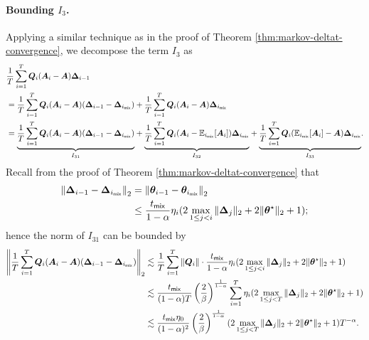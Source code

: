 \paragraph{Bounding $I_3$.} Applying a similar technique as in the proof of Theorem \ref{thm:markov-deltat-convergence}, we decompose the term $I_3$ as
\begin{align}\label{eq:markov-bar-deltat-I3-decompose}
&\frac{1}{T}\sum_{i=1}^T \bm{Q}_i (\bm{A}_i-\bm{A})\bm{\Delta}_{i-1} \nonumber \\ 
&=\frac{1}{T} \sum_{i=1}^T \bm{Q}_i(\bm{A}_i - \bm{A}) (\bm{\Delta}_{i-1} -\bm{\Delta}_{i_{\mathsf{mix}}}) + \frac{1}{T}\sum_{i=1}^T \bm{Q}_i(\bm{A}_i - \bm{A}) \bm{\Delta}_{i_{\mathsf{mix}}} \nonumber \\
&= \underset{I_{31}}{\underbrace{\frac{1}{T} \sum_{i=1}^T \bm{Q}_i(\bm{A}_i - \bm{A}) (\bm{\Delta}_{i-1} -\bm{\Delta}_{i_{\mathsf{mix}}})}} + \underset{I_{32}}{\underbrace{\frac{1}{T}\sum_{i=1}^T \bm{Q}_i(\bm{A}_i - \mathbb{E}_{i_{\mathsf{mix}}}[\bm{A}_i])\bm{\Delta}_{i_{\mathsf{mix}}} }}+ \underset{I_{33}}{\underbrace{\frac{1}{T}\sum_{i=1}^T \bm{Q}_i(\mathbb{E}_{i_{\mathsf{mix}}}[\bm{A}_i] - \bm{A}) \bm{\Delta}_{i_{\mathsf{mix}}} }}.
\end{align}
Recall from the proof of Theorem \ref{thm:markov-deltat-convergence} that 
\begin{align*}
\left\|\bm{\Delta}_{i-1} -\bm{\Delta}_{i_{\mathsf{mix}}}\right\|_2&= \left\|\bm{\theta}_{i-1} -\bm{\theta}_{i_{\mathsf{mix}}}\right\|_2 \\ 
&\leq \frac{t_{\mathsf{mix}}}{1-\alpha} \eta_i (2 \max_{1 \leq j < i} \|\bm{\Delta}_j\|_2 + 2\|\bm{\theta}^\star\|_2  + 1);
\end{align*}
hence the norm of $I_{31}$ can be bounded by
\begin{align}
\label{eq:markov-bar-deltat-I31-bound}
\left\|\frac{1}{T} \sum_{i=1}^T \bm{Q}_i(\bm{A}_i - \bm{A}) (\bm{\Delta}_{i-1} -\bm{\Delta}_{i_{\mathsf{mix}}})\right\|_2
&\lesssim \frac{1}{T} \sum_{i=1}^T \|\bm{Q}_i\| \cdot \frac{t_{\mathsf{mix}}}{1-\alpha} \eta_i (2 \max_{1 \leq j < i} \|\bm{\Delta}_j\|_2 + 2\|\bm{\theta}^\star\|_2  + 1) \nonumber \\ 
&\lesssim \frac{t_{\mathsf{mix}}}{(1-\alpha)T}\left(\frac{2}{\beta}\right)^{\frac{1}{1-\alpha}}\sum_{i=1}^T \eta_i (2 \max_{1 \leq j < T} \|\bm{\Delta}_j\|_2 + 2\|\bm{\theta}^\star\|_2  + 1) \nonumber \\ 
&\lesssim \frac{t_{\mathsf{mix}} \eta_0 }{(1-\alpha)^2}  \left(\frac{2}{\beta}\right)^{\frac{1}{1-\alpha}} (2 \max_{1 \leq j < T} \|\bm{\Delta}_j\|_2 + 2\|\bm{\theta}^\star\|_2  + 1) T^{-\alpha}.
\end{align}
